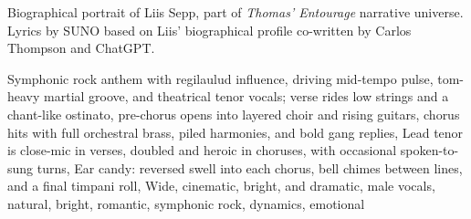 
\begin{notes}
Biographical portrait of Liis Sepp, part of \emph{Thomas’ Entourage} narrative universe. Lyrics by SUNO based on Liis' biographical profile co-written by Carlos Thompson and ChatGPT.
\end{notes}
\begin{style}
Symphonic rock anthem with regilaulud influence, driving mid-tempo pulse, tom-heavy martial groove, and theatrical tenor vocals; verse rides low strings and a chant-like ostinato, pre-chorus opens into layered choir and rising guitars, chorus hits with full orchestral brass, piled harmonies, and bold gang replies, Lead tenor is close-mic in verses, doubled and heroic in choruses, with occasional spoken-to-sung turns, Ear candy: reversed swell into each chorus, bell chimes between lines, and a final timpani roll, Wide, cinematic, bright, and dramatic, male vocals, natural, bright, romantic, symphonic rock, dynamics, emotional
\end{style}
